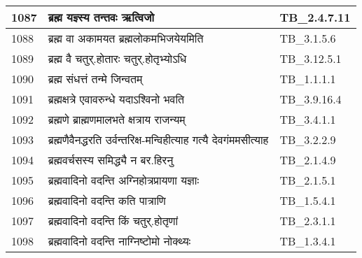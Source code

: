 \documentclass[17pt]{extarticle}
\begin{document}
\begin{longtable}{||p{0.4in}||p{4.9in}||p{0.9in}||}
    1087 & ब्रह्म यज्ञ्स्य तन्तवः ऋत्विजो & TB\_2.4.7.11       \\
    
    \hline
        
    1088 & ब्रह्म वा अकामयत ब्रह्मलोकमभिजयेयमिति & TB\_3.1.5.6       \\
    
    \hline
        
    1089 & ब्रह्म वै चतुर्.होतारः चतुर्.होतृभ्योऽधि & TB\_3.12.5.1       \\
    
    \hline
        
    1090 & ब्रह्म संधत्तं तन्मे जिन्वतम् & TB\_1.1.1.1       \\
    
    \hline
        
    1091 & ब्रह्मक्षत्रे एवावरुन्धे यदाऽश्विनो भवति & TB\_3.9.16.4       \\
    
    \hline
        
    1092 & ब्रह्मणे ब्राह्मणमालभते क्षत्राय राजन्यम् & TB\_3.4.1.1       \\
    
    \hline
        
    1093 & ब्रह्मणैवैनद्धरति उर्वन्तरिक्ष{-}मन्विहीत्याह गत्यै देवगंममसीत्याह & TB\_3.2.2.9       \\
    
    \hline
        
    1094 & ब्रह्मवर्चसस्य समिद्ध्यै न बर.हिरनु & TB\_2.1.4.9       \\
    
    \hline
        
    1095 & ब्रह्मवादिनो वदन्ति अग्निहोत्रप्रायणा यज्ञाः & TB\_2.1.5.1       \\
    
    \hline
        
    1096 & ब्रह्मवादिनो वदन्ति कति पात्राणि & TB\_1.5.4.1       \\
    
    \hline
        
    1097 & ब्रह्मवादिनो वदन्ति किं चतुर्.होतृणां & TB\_2.3.1.1       \\
    
    \hline
        
    1098 & ब्रह्मवादिनो वदन्ति नाग्निष्टोमो नोक्थ्यः & TB\_1.3.4.1       \\
    
    \hline
        

\end{longtable}
\end{document}
